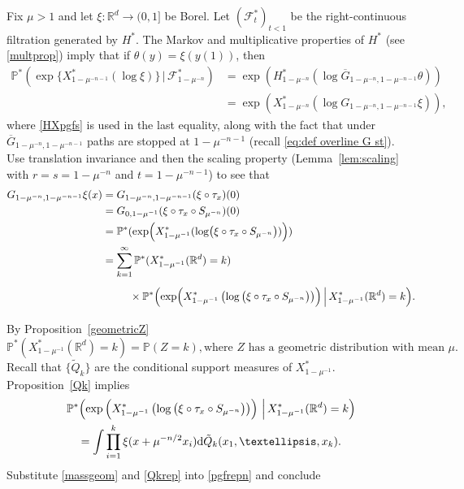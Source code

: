 \documentclass[12pt]{article}
\makeatletter
\renewenvironment{proof}[1][\proofname]{%
\par\pushQED{\qed}\normalfont%
\topsep6\p@\@plus6\p@\relax
\trivlist\item[\hskip\labelsep\bfseries#1\@addpunct{.}]%
\ignorespaces
}{%
\popQED\endtrivlist\@endpefalse
}
\numberwithin{theorem}{section}
\theoremstyle{def}
\numberwithin{equation}{section}
\renewcommand{\P}{\mathbb{P}}
\newcommand{\R}{\mathbb{R}}
\newcommand{\cF}{\mathcal F}
\makeatother
\begin{document}
\begin{proof} Fix $\mu>1$ and let $\xi:\R^d\to(0,1]$ be Borel. Let $(\cF^*_t)_{t<1}$ be the right-continuous filtration generated by $H^*$. The Markov and multiplicative properties of $H^*$ (see \eqref{multprop}) imply that if $\theta(y)=\xi(y(1))$, then
\begin{align}\label{condpgf2}
\nonumber \P^*(\exp\{X^*_{1-\mu^{-n-1}}(\log\xi)\} \, | \, \cF^*_{1-\mu^{-n}})&=\exp(H^*_{1-\mu^{-n}}(\log \overline G_{1-\mu^{-n},1-\mu^{-n-1}}\theta))\\
&=\exp(X^*_{1-\mu^{-n}}(\log G_{1-\mu^{-n},1-\mu^{-n-1}}\xi)),
\end{align}
where \eqref{HXpgfs} is used in the last equality, along with the fact that under $\overline G_{1-\mu^{-n},1-\mu^{-n-1}}$ paths are stopped at $1-\mu^{-n-1}$ (recall \eqref{eq:def overline G st}).
 Use translation invariance and then the scaling property (Lemma~\ref{lem:scaling} with $r=s=1-\mu^{-n}$ and $t=1-\mu^{-n-1}$) to see that
\begin{align}\label{pgfrepn}
\nonumber G_{1-\mu^{-n},1-\mu^{-n-1}}\xi(x)&=G_{1-\mu^{-n},1-\mu^{-n-1}}(\xi\circ\tau_x)(0)\\
\nonumber&=G_{0,1-\mu^{-1}}(\xi\circ\tau_x\circ S_{\mu^{-n}})(0)\\
\nonumber&=\P^*(\exp(X^*_{1-\mu^{-1}}(\log(\xi\circ\tau_x\circ S_{\mu^{-n}}))))\\
 &=\sum_{k=1}^\infty \P^*(X^*_{1-\mu^{-1}}(\R^d)=k)\\
\nonumber&\phantom{=\sum_{k=1}^\infty}\times \P^*\Bigl(\exp(X^*_{1-\mu^{-1}}\left(\log \left(\xi\circ\tau_x\circ S_{\mu^{-n}}\right)\right)) \, \Bigl| \, X^*_{1-\mu^{-1}}(\R^d)=k\Bigr).
\end{align}
By Proposition~\ref{geometricZ}
\begin{equation}\label{massgeom}
\P^*(X^*_{1-\mu^{-1}}(\R^d)=k)=\P(Z=k),\text{where $Z$ has a geometric distribution with mean $\mu$}.
\end{equation}
Recall that $\{\tilde Q_k\}$ are the conditional support measures of $X^*_{1-\mu^{-1}}$. 
Proposition~\ref{Qk} implies 
\begin{multline}\label{Qkrep}
\P^*\Bigl(\exp\left(X^*_{1-\mu^{-1}}\left(\log \left(\xi\circ\tau_x\circ S_{\mu^{-n}}\right)\right)\right) \, \Bigl| \, X^*_{1-\mu^{-1}}(\R^d)=k\Bigr)\\
=\int\prod_{i=1}^k\xi(x+\mu^{-n/2}x_i)\dd \tilde Q_k(x_1,\dots,x_k).
\end{multline}
Substitute \eqref{massgeom} and \eqref{Qkrep} into \eqref{pgfrepn} and conclude

\end{proof}
\end{document}
